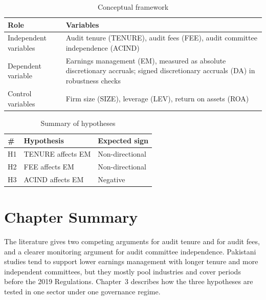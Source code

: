 \begin{table}[ht]
  \centering
  \caption{Conceptual framework}
  \label{tab:framework}
  \small
  \begin{tabular}{@{}p{4cm}p{10.5cm}@{}}
    \toprule
    Role & Variables \\
    \midrule
    Independent variables & Audit tenure (TENURE), audit fees (FEE), audit committee independence (ACIND) \\
    Dependent variable & Earnings management (EM), measured as absolute discretionary accruals; signed discretionary accruals (DA) in robustness checks \\
    Control variables & Firm size (SIZE), leverage (LEV), return on assets (ROA) \\
    \bottomrule
  \end{tabular}
\end{table}

\begin{table}[ht]
  \centering
  \caption{Summary of hypotheses}
  \label{tab:hypotheses}
  \small
  \begin{tabular}{@{}llp{3.5cm}@{}}
    \toprule
    \# & Hypothesis & Expected sign \\
    \midrule
    H1 & TENURE affects EM & Non-directional \\
    H2 & FEE affects EM & Non-directional \\
    H3 & ACIND affects EM & Negative \\
    \bottomrule
  \end{tabular}
\end{table}

\section{Chapter Summary}

The literature gives two competing arguments for audit tenure and for audit fees, and a clearer monitoring argument for audit committee independence. Pakistani studies tend to support lower earnings management with longer tenure and more independent committees, but they mostly pool industries and cover periods before the 2019 Regulations. Chapter~3 describes how the three hypotheses are tested in one sector under one governance regime.
